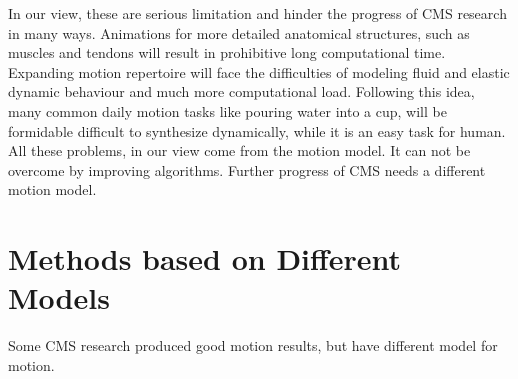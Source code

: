 In our view, 
these are serious limitation and hinder the progress of CMS research in many ways. 
Animations for more detailed anatomical structures, such as muscles and tendons will result in prohibitive long computational time. 
Expanding motion repertoire will face the difficulties of modeling fluid and elastic dynamic behaviour and much more computational load.
Following this idea,  
many common daily motion tasks like pouring water into a cup, will be formidable difficult to synthesize dynamically, 
while it is an easy task for human.  
All these problems, in our view come from the motion model. 
It can not be overcome by improving  algorithms. 
Further progress of CMS needs a different motion model.

\section{Methods based on Different Models}
Some CMS research produced good motion results, but have different model for motion.
